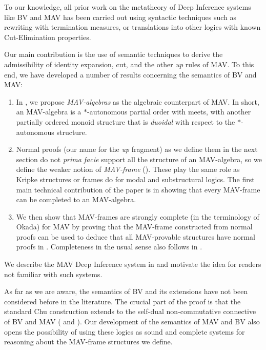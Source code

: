 To our knowledge, all prior work on the metatheory of Deep Inference systems like BV and MAV has been carried out using syntactic techniques such as rewriting with termination measures, or translations into other logics with known Cut-Elimination properties.

Our main contribution is the use of semantic techniques to derive the admissibility of identity expansion, cut, and the other \emph{up} rules of MAV. To this end, we have developed a number of results concerning the semantics of BV and MAV:
\begin{enumerate}
      \item In , we propose \emph{MAV-algebras} as the algebraic counterpart of MAV. In short, an MAV-algebra is a $*$-autonomous partial order with meets, with another partially ordered monoid structure that is \emph{duoidal} with respect to the $*$-autonomous structure.
      \item Normal proofs (our name for the \emph{up} fragment) as we define them in the next section do not {\it prima facie} support all the structure of an MAV-algebra, so we define the weaker notion of \emph{MAV-frame} (). These play the same role as Kripke structures or frames do for modal and substructural logics. The first main technical contribution of the paper is in showing that every MAV-frame can be completed to an MAV-algebra.
      \item We then show that MAV-frames are strongly complete (in the terminology of Okada) for MAV by proving that the MAV-frame constructed from normal proofs can be used to deduce that all MAV-provable structures have normal proofs in . Completeness in the usual sense also follows in .
\end{enumerate}

We describe the MAV Deep Inference system in  and motivate the idea for readers not familiar with such systems.

As far as we are aware, the semantics of BV and its extensions have not been considered before in the literature. The crucial part of the proof is that the standard Chu construction extends to the self-dual non-commutative connective of BV and MAV ( and ). Our development of the semantics of MAV and BV also opens the possibility of using these logics as sound and complete systems for reasoning about the MAV-frame structures we define.


